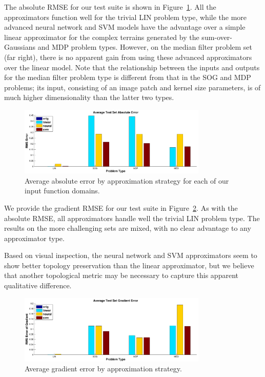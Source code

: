 \documentclass{article}
\begin{document}
The absolute RMSE for our test suite is shown in Figure~\ref{fig:results_absolute_rmse}. All the approximators function well for the trivial LIN problem type, while the more advanced neural network and SVM models have the advantage over a simple linear approximator for the complex terrains generated by the sum-over-Gaussians and MDP problem types. However, on the median filter problem set (far right), there is no apparent gain from using these advanced approximators over the linear model. Note that the relationship between the inputs and outputs for the median filter problem type is different from that in the SOG and MDP problems; its input, consisting of an image patch and kernel size parameters, is of much higher dimensionality than the latter two types.


\begin{figure}
  \centering
  \includegraphics[width=0.8\textwidth]{images/results_rmse}
  \caption{Average absolute error by approximation strategy for each of our input function domains.}
  \label{fig:results_absolute_rmse}
\end{figure}

We provide the gradient RMSE for our test suite in Figure~\ref{fig:results_grad_rmse}. As with the absolute RMSE, all approximators handle well the trivial LIN problem type. The results on the more challenging sets are mixed, with no clear advantage to any approximator type.

Based on visual inspection, the neural network and SVM approximators seem to show better topology preservation than the linear approximator, but we believe that another topological metric may be necessary to capture this apparent qualitative difference.

\begin{figure}
  \centering
  \includegraphics[width=0.8\textwidth]{images/results_grad_rmse}
  \caption{Average gradient error by approximation strategy. }
  \label{fig:results_grad_rmse}
\end{figure}
\end{document}
